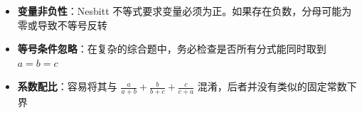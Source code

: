 \begin{trapbox}
\begin{itemize}
    \item \textbf{变量非负性}：Nesbitt 不等式要求变量必须为正。如果存在负数，分母可能为零或导致不等号反转
    \item \textbf{等号条件忽略}：在复杂的综合题中，务必检查是否所有分式能同时取到 $a=b=c$ 
    \item \textbf{系数配比}：容易将其与 $\frac{a}{a+b} + \frac{b}{b+c} + \frac{c}{c+a}$ 混淆，后者并没有类似的固定常数下界 
\end{itemize}
\end{trapbox}